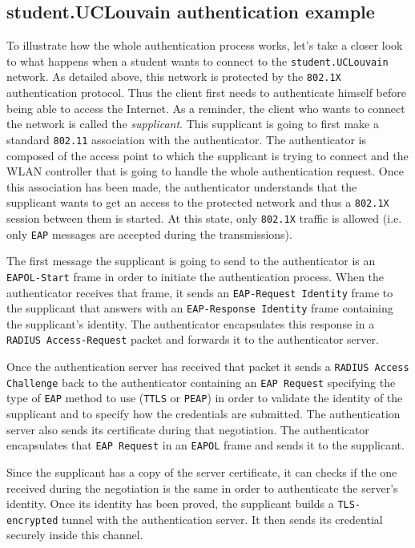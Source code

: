 \subsection{student.UCLouvain authentication example}
To illustrate how the whole authentication process works, let's take a closer look to what happens when a student wants to connect to the \texttt{student.UCLouvain} network.
As detailed above, this network is protected by the \texttt{802.1X} authentication protocol. Thus the client first needs to authenticate himself before being able to access the Internet.
As a reminder, the client who wants to connect the network is called the \textit{supplicant}. This supplicant is going to first make a standard \texttt{802.11} association with the authenticator. The authenticator is composed of the access point to which the supplicant is trying to connect and the WLAN controller that is going to handle the whole authentication request. Once this association has been made, the authenticator understands that the supplicant wants to get an access to the protected network and thus a \texttt{802.1X} session between them is started. At this state, only \texttt{802.1X} traffic is allowed (i.e. only \texttt{EAP} messages are accepted during the transmissions).

The first message the supplicant is going to send to the authenticator is an \texttt{EAPOL-Start} frame in order to initiate the authentication process. When the authenticator receives that frame, it sends an \texttt{EAP-Request Identity} frame to the supplicant that answers with an \texttt{EAP-Response Identity} frame containing the supplicant's identity. The authenticator encapsulates this response in a \texttt{RADIUS Access-Request} packet and forwards it to the authenticator server.

Once the authentication server has received that packet it sends a \texttt{RADIUS Access Challenge} back to the authenticator containing an \texttt{EAP Request} specifying the type of \texttt{EAP} method to use (\texttt{TTLS} or \texttt{PEAP}) in order to validate the identity of the supplicant and to specify how the credentials are submitted. The authentication server also sends its certificate during that negotiation. The authenticator encapsulates that \texttt{EAP Request} in an \texttt{EAPOL} frame and sends it to the supplicant.

Since the supplicant has a copy of the server certificate, it can checks if the one received during the negotiation is the same in order to authenticate the server's identity. Once its identity has been proved, the supplicant builds a \texttt{TLS-encrypted} tunnel with the authentication server. It then sends its credential securely inside this channel.

